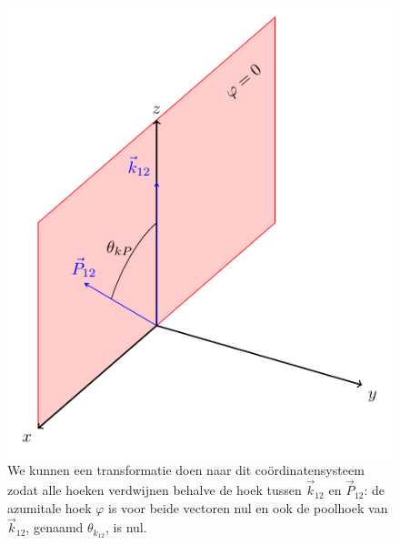 \documentclass[11pt,twoside]{book}
\begin{document}
\begin{figure}[h]
\centering
\includegraphics[scale=0.85]{./figuren/assenstelsel1.pdf}
\caption{We kunnen een transformatie doen naar dit co\"{o}rdinatensysteem zodat alle hoeken verdwijnen behalve de hoek tussen $\vec{k}_{12}$ en $\vec{P}_{12}$: de azumitale hoek $\varphi$ is voor beide vectoren nul en ook de poolhoek van $\vec{k}_{12}$, genaamd $\theta_{k_{12}}$, is nul.  }
\label{fig:assen}
\end{figure}
\end{document}
